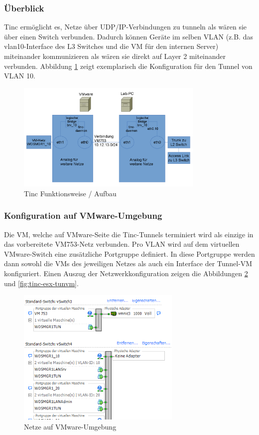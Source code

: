 \subsubsection{Überblick}
Tinc ermöglicht es, Netze über UDP/IP-Verbindungen zu tunneln als wären sie über einen Switch verbunden. Dadurch können Geräte im selben VLAN (z.B. das vlan10-Interface des L3 Switches und die VM für den internen Server) miteinander kommunizieren als wären sie direkt auf Layer 2 miteinander verbunden. Abbildung \ref{fig:tinc} zeigt exemplarisch die Konfiguration für den Tunnel von VLAN 10.

\begin{figure}[H]
\centering
\includegraphics[width=0.8\textwidth]{Phase2/tinc_netz.png}
\caption{Tinc Funktionsweise / Aufbau}
\label{fig:tinc}
\end{figure}

\subsubsection{Konfiguration auf VMware-Umgebung}
Die VM, welche auf VMware-Seite die Tinc-Tunnels terminiert wird als einzige in das vorbereitete VM753-Netz verbunden. Pro VLAN wird auf dem virtuellen VMware-Switch eine zusätzliche Portgruppe definiert. In diese Portgruppe werden dann sowohl die VMs des jeweiligen Netzes als auch ein Interface der Tunnel-VM konfiguriert. Einen Auszug der Netzwerkkonfiguration zeigen die Abbildungen \ref{fig:tinc-esx-overview} und \ref{fig:tinc-esx-tunvm}.

\begin{figure}[H]
\centering
\includegraphics[width=0.7\textwidth]{Phase2/tinc_esx_netz.png}
\caption{Netze auf VMware-Umgebung}
\label{fig:tinc-esx-overview}
\end{figure}

